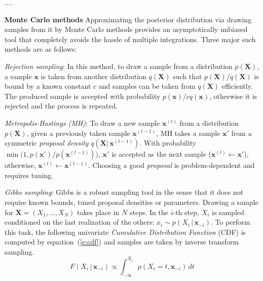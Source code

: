 \documentclass{article}
\newcommand{\bvec}[1]{\textbf{#1}}
\newcommand{\pr}{p}
\begin{document}
{{....


\textbf{Monte Carlo methods}
Approximating the posterior distribution via drawing samples from it by Monte Carlo methods 
provides an asymptotically unbiased tool that completely avoids the hassle of multiple integrations.%
Three major such methods are as follows:

\emph{Rejection sampling}: In this method, to draw a sample from 
a distribution $p(\bvec{X})$, a sample $\bvec{x}$ is taken from another distribution $q(\bvec{X})$
such that $p(\bvec{X})/q(\bvec{X})$ is bound by a known constant $c$
and samples can be taken from $q(\bvec{X})$ efficiently.
The produced sample is accepted with probability $p(\bvec{x}) / c q(\bvec{x})$, 
otherwise it is rejected and the process is repeated. 

\emph{Metropolis-Hastings (MH)}:
To draw a new sample $\bvec{x}^{(t)}$ from a distribution $p(\bvec{X})$, given a previously taken sample $\bvec{x}^{(t-1)}$, 
MH takes a sample $\bvec{x}'$ from a symmetric \emph{proposal density} $q(\bvec{X} |\, \bvec{x}^{(t-1)})$. 
With probability $\min \big(1, p(\bvec{x}')/p(\bvec{x}^{(t-1)}) \big)$, 
$\bvec{x}'$ is accepted as the next sample ($\bvec{x}^{(t)} \leftarrow \bvec{x}'$), otherwise, $\bvec{x}^{(t)} \leftarrow \bvec{x}^{(t-1)}$. 
Choosing a good \emph{proposal} is problem-dependent and requires tuning. 


\emph{Gibbs sampling}:
Gibbs is a robust sampling tool in the sense that it does not require known bounds, tuned proposal densities or parameters.
Drawing a sample for $\bvec{X} = (X_1, \ldots, X_N)$ takes place in $N$ steps.
In the $i$-th step, $X_i$ is sampled conditioned on the last realization of the others:
$x_i \sim \pr(X_i \,|\, \bvec{x}_{-i})$. 
To perform this task, the following univariate \emph{Cumulative Distribution Function} (CDF)
is computed by equation~(\ref{e:cdf}) and samples are taken by inverse transform sampling. 
{\footnotesize
\begin{equation}
\label{e:cdf}
F(X_i  \,|\, \bvec{x}_{-i}) 
\propto
\int_{-\infty}^{X_i} \!\!\!\! \pr(X_i = t, \bvec{x}_{-i}) \, d  t
\end{equation} 
}

}}
\end{document}
